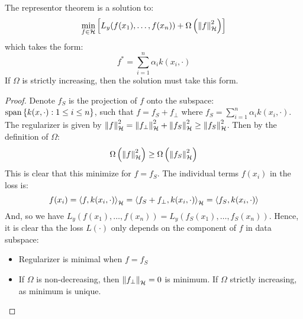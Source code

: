 \begin{theorem}
    The representor theorem is a solution to:
    \begin{equation*}
        \min_{f\in\mathcal{H}}\left[ L_y(f(x_1), \dots,f(x_n)) + \Omega\left( \left\lVert f\right\rVert^2_\mathcal{H} \right) \right]
    \end{equation*}
    which takes the form:
    \begin{equation*}
        f^* = \sum^n_{i=1} \alpha_ik(x_i, \cdot) 
    \end{equation*}
    If $\Omega$ is strictly increasing, then the solution must take this form.
\end{theorem}
\begin{proof}
    Denote $f_S$ is the projection of $f$ onto the subspace: $\operatorname{span}\left\{ k(x,\cdot) : 1\le i\le n \right\}$, such that $f = f_S + f_\bot$ where $f_S = \sum^n_{i=1}\alpha_ik(x_i, \cdot)$. The regularizer is given by $\left\lVert f\right\rVert^2_\mathcal{H} = \left\lVert f_\bot\right\rVert^2_\mathcal{H} + \left\lVert f_S\right\rVert^2_\mathcal{H} \ge \left\lVert f_S\right\rVert^2_\mathcal{H}$. Then by the definition of $\Omega$:
    \begin{equation*}
        \Omega\left( \left\lVert f\right\rVert^2_\mathcal{H} \right)\ge\Omega\left( \left\lVert f_S\right\rVert^2_\mathcal{H} \right)
    \end{equation*}
    This is clear that this minimize for $f=f_S$. The individual terms $f(x_i)$ in the loss is:
    \begin{equation*}
        f(x_i) = \left\langle f, k(x_i,\cdot) \right\rangle_\mathcal{H} = \left\langle f_S + f_\bot, k(x_i, \cdot) \right\rangle_\mathcal{H} = \left\langle f_S, k(x_i,\cdot) \right\rangle
    \end{equation*}
    And, so we have $L_y(f(x_1),\dots,f(x_n)) = L_y(f_S(x_1),\dots,f_S(x_n))$. Hence, it is clear tha the loss $L(\cdot)$ only depends on the component of $f$ in data subspace:
    \begin{itemize}
        \item Regularizer is minimal when $f=f_S$
        \item If $\Omega$ is non-decreasing, then $\left\lVert f_\bot\right\rVert_\mathcal{H}=0$ is minimum. If $\Omega$ strictly increasing, as minimum is unique. 
    \end{itemize}
\end{proof}

